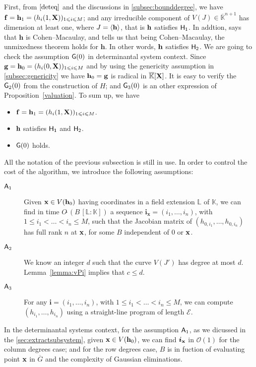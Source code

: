 \documentclass[11pt]{article}
\numberwithin{Property}{section}
\numberwithin{Theorem}{section}
\numberwithin{Proposition}{section}
\numberwithin{Lemma}{section}
\numberwithin{Corollary}{section}
\numberwithin{Definition}{section}
\numberwithin{Remark}{section}
\numberwithin{Conjecture}{section}
\numberwithin{Problem}{section}
\numberwithin{Claim}{section}
\theoremstyle{definition}
\numberwithin{Example}{section}
\def\h {\ensuremath{\mathbf{h}}}
\def\g {\ensuremath{\mathbf{g}}}
\renewcommand{\leq}{\leqslant}
\renewcommand{\le}{\leqslant}
\def\bar{\overline}
\newcommand{\bigO}[1]{\mathcal{O}(#1)} %
\renewcommand{\le}{\leqslant} %
\newcommand{\field}{\mathbb{K}} %
\newcommand{\mat}[1]{\mathbf{\MakeUppercase{#1}}} %
\newcommand{\improve}[1]{\textcolor{blue}{#1}} %
\begin{document}
First, from $\cref{deteq}$ and the discussions in \improve{\cref{subsec:bounddegree}}, we have ${\bf{f}} = {\bf{h}}_1 = (h_i(1,\mat{X}))_{1 \leq i \leq M}$; and any irreducible component of $V(J) \in \bar{\field}^{n+1}$ has dimension at least one, where $J = \langle {\bf h} \rangle$, that is $\bf{h}$ satisfies $\sf{H}_1$. In addtion, \cite[~Corollary 16.44]{Miller04} says that $\h$ is Cohen--Macaulay, and \cite[~Theorem 17.6]{Matsumura86} tells us that being Cohen--Macaulay, the unmixedness theorem holds for $\h$. In other words, $\bf{h}$ satisfies $\sf{H}_2$. We are going to check the assumption ${\sf G}(0)$ in determinantal system context. Since $\g = {\bf{h}}_0 = (h_i(0,\mat{X}))_{1 \leq i \leq M}$ and by using the genericity assumption in \improve{\cref{subsec:genericity}} we have ${\bf{h}}_0 = \g$ is radical in $\bar{\field}[\mat{X}]$. It is easy to verify the ${\sf G}_2(0)$ from the construction of $H$; and ${\sf G}_3(0)$ is an other expression of Proposition~\ref{valuation}. To sum up, we have
\begin{itemize}
\item ${\bf{f}} = {\bf{h}}_1 = (h_i(1,\mat{X}))_{1 \leq i \leq M}$. 
\item $\bf{h}$ satisfies $\sf{H}_1$ and $\sf{H}_2$.
\item ${\sf G}(0)$ holds.
\end{itemize}
All the notation of the previous subsection is still in use. In order to control the cost of the algorithm, we introduce the following assumptions:
\begin{description}
\item[${\sf A}_1$] Given ${\bf x} \in V(\h_0)$ having coordinates in a field extension $\mathbb{L}$ of $\field$, we can find in time $O\tilde{~}(B\, [\mathbb{L} : \field])$ a sequence ${\bm i}_{\mathbf{x}}= (i_1,\dots,i_n)$, with $1 \le i_1 < \dots < i_n \le M$, such that the Jacobian matrix of $(h_{0,i_1},\dots,h_{0,{i_n}})$ has full rank $n$ at ${\bf x}$, for some $B$ independent of $0$ or ${\bf x}$.
\item[${\sf A}_2$] We know an integer $d$ such that the curve $V(J')$ has degree at most $d$. Lemma~\ref{lemma:vPi} implies that  $c \le d$.
\item[${\sf A}_3$] For any ${\bm i}=(i_1,\dots,i_n)$, with $1 \le i_1 <
  \dots < i_n \le M$, we can compute $(h_{i_1},\dots,h_{{i_n}})$ using
  a straight-line program of length $\mathcal{E}$.
\end{description}

In the determinantal systems context, for the assumption ${\sf A}_1$, as we dicussed in the \improve{\cref{sec:extractsubsystem}}, given ${\bf x} \in V(\h_0)$, we can find ${\bm i}_{\bf x}$ in $\bigO{1}$ for the column degrees case; and for the row degrees case, $B$ is in fuction of evaluating point ${\bf x}$ in $\bar{G}$ and the complexity of Gaussian eliminations.  
\end{document}
